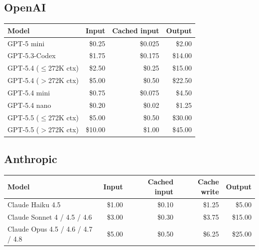 \documentclass[11pt,a4paper]{article}
\begin{document}
\subsection*{OpenAI}
\begin{table}[h]
\centering\small
\begin{tabular}{@{}lrrr@{}}
\toprule
\textbf{Model} & \textbf{Input} & \textbf{Cached input} & \textbf{Output} \\
\midrule
GPT-5 mini                  & \$0.25 & \$0.025 & \$2.00 \\
GPT-5.3-Codex               & \$1.75 & \$0.175 & \$14.00 \\
GPT-5.4 ($\leq$272K ctx)    & \$2.50 & \$0.25  & \$15.00 \\
GPT-5.4 ($>$272K ctx)       & \$5.00 & \$0.50  & \$22.50 \\
GPT-5.4 mini                & \$0.75 & \$0.075 & \$4.50 \\
GPT-5.4 nano                & \$0.20 & \$0.02  & \$1.25 \\
GPT-5.5 ($\leq$272K ctx)    & \$5.00 & \$0.50  & \$30.00 \\
GPT-5.5 ($>$272K ctx)       & \$10.00& \$1.00  & \$45.00 \\
\bottomrule
\end{tabular}
\end{table}

\subsection*{Anthropic}
\begin{table}[h]
\centering\small
\begin{tabular}{@{}lrrrr@{}}
\toprule
\textbf{Model} & \textbf{Input} & \textbf{Cached input} & \textbf{Cache write} & \textbf{Output} \\
\midrule
Claude Haiku 4.5         & \$1.00 & \$0.10 & \$1.25 & \$5.00 \\
Claude Sonnet 4 / 4.5 / 4.6 & \$3.00 & \$0.30 & \$3.75 & \$15.00 \\
Claude Opus 4.5 / 4.6 / 4.7 / 4.8 & \$5.00 & \$0.50 & \$6.25 & \$25.00 \\
\bottomrule
\end{tabular}
\end{table}
\end{document}
